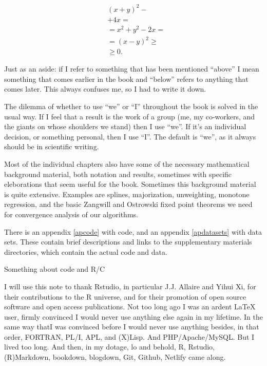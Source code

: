 \documentclass[
  12pt,
]{book}
\begin{document}
\begin{align}
&(x+y)^2-\\
&+4x=\\
&=x^2+y^2-2x=\\
&=(x-y)^2\geq\\
&\geq 0.
\end{align}

Just as an aside: if I refer to something that has been mentioned
``above'' I mean something that comes earlier in the book and ``below''
refers to anything that comes later. This always confuses me, so I had
to write it down.

The dilemma of whether to use ``we'' or ``I'' throughout the book is solved
in the usual way. If I feel that a result is the work of a group (me, my
co-workers, and the giants on whose shoulders we stand) then I use ``we''.
If it's an individual decision, or something personal, then I use ``I''.
The default is ``we'', as it always should be in scientific writing.

Most of the individual chapters also have some of the necessary mathematical background material, both notation and results, sometimes with specific eleborations that seem useful for the book. Sometimes this background material is quite extensive. Examples are splines, majorization, unweighting, monotone
regression, and the basic Zangwill and Ostrowski fixed point theorems we need for convergence analysis of our algorithms.

There is an appendix \ref{apcode} with code, and an appendix
\ref{apdatasets} with data sets. These contain brief descriptions and links to the supplementary materials directories, which contain the actual code and data.

Something about code and R/C

I will use this note to thank Rstudio, in particular J.J. Allaire and
Yihui Xi, for their contributions to the R universe, and for their
promotion of open source software and open access publications. Not too
long ago I was an ardent LaTeX user, firmly convinced I would never use
anything else again in my lifetime. In the same way thatI was convinced before I would never use anything besides, in that order,
FORTRAN, PL/I, APL, and (X)Lisp. And PHP/Apache/MySQL. But I lived too long. And then, in my dotage, lo and behold, R, Rstudio, (R)Markdown, bookdown, blogdown, Git, Github, Netlify came along.
\end{document}
